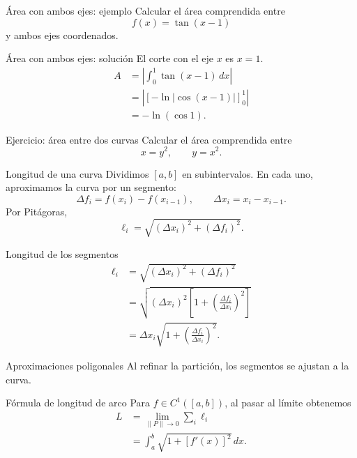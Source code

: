 \documentclass[original_version/main.tex]{subfiles}
\begin{document}
\begin{frame}{Área con ambos ejes: ejemplo}
Calcular el área comprendida entre\[f(x)=\tan(x-1)\]y ambos ejes coordenados.
\end{frame}

\begin{frame}{Área con ambos ejes: solución}
El corte con el eje $x$ es $x=1$.\begin{align*}A&=\left|\int_0^1\tan(x-1)\,dx\right|\\&=\left|[-\ln|\cos(x-1)|]_0^1\right|\\&=\boxed{-\ln(\cos1)}.\end{align*}
\end{frame}

\begin{frame}{Ejercicio: área entre dos curvas}
Calcular el área comprendida entre\[x=y^2,\qquad y=x^2.\]
\end{frame}

\begin{frame}{Longitud de una curva}
\small Dividimos $[a,b]$ en subintervalos. En cada uno, aproximamos la curva por un segmento:\[\Delta f_i=f(x_i)-f(x_{i-1}),\qquad \Delta x_i=x_i-x_{i-1}.\]Por Pitágoras,\[\ell_i=\sqrt{(\Delta x_i)^2+(\Delta f_i)^2}.\]
\end{frame}

\begin{frame}{Longitud de los segmentos}
\begin{align*}\ell_i&=\sqrt{(\Delta x_i)^2+(\Delta f_i)^2}\\&=\sqrt{(\Delta x_i)^2\left[1+\left(\frac{\Delta f_i}{\Delta x_i}\right)^2\right]}\\&=\Delta x_i\sqrt{1+\left(\frac{\Delta f_i}{\Delta x_i}\right)^2}.\end{align*}
\end{frame}

\begin{frame}{Aproximaciones poligonales}
Al refinar la partición, los segmentos se ajustan a la curva.
\end{frame}

\begin{frame}{Fórmula de longitud de arco}
Para $f\in C^1([a,b])$, al pasar al límite obtenemos\begin{align*}L&=\lim_{\|P\|\to0}\sum_i\ell_i\\&=\boxed{\int_a^b\sqrt{1+[f\prime(x)]^2}\,dx.}\end{align*}
\end{frame}
\end{document}
